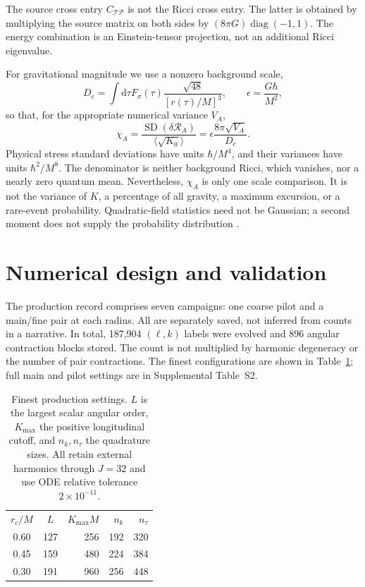\documentclass[aps,prd,reprint,floatfix,nofootinbib,longbibliography]{revtex4-2}
\newcommand{\dd}{\mathrm{d}}
\newcommand{\Tr}{\mathcal{T}}
\newcommand{\Pp}{\mathcal{P}}
\newcommand{\ee}{\epsilon}
\newcommand{\RMS}{\operatorname{SD}}
\begin{document}
The source cross entry $C_{\Tr\Pp}$ is not the Ricci cross entry. The latter is obtained by multiplying the source matrix on both sides by $(8\pi G)\operatorname{diag}(-1,1)$. The energy combination is an Einstein-tensor projection, not an additional Ricci eigenvalue.

For gravitational magnitude we use a nonzero background scale,
\begin{equation}
 D_c=\int\dd\tau F_\sigma(\tau)\frac{\sqrt{48}}{[r(\tau)/M]^3},
 \qquad \ee=\frac{G\hbar}{M^2},
\end{equation}
so that, for the appropriate numerical variance $V_A$,
\begin{equation}
 \chi_A=\frac{\RMS(\delta\mathcal R_A)}{\langle\sqrt{K_0}\rangle}
       =\ee\frac{8\pi\sqrt{V_A}}{D_c}.
 \label{eq:chi}
\end{equation}
Physical stress standard deviations have units $\hbar/M^4$, and their variances have units $\hbar^2/M^8$. The denominator is neither background Ricci, which vanishes, nor a nearly zero quantum mean. Nevertheless, $\chi_A$ is only one scale comparison. It is not the variance of $K$, a percentage of all gravity, a maximum excursion, or a rare-event probability. Quadratic-field statistics need not be Gaussian; a second moment does not supply the probability distribution \cite{FewsterFordRoman2012}.

\section{Numerical design and validation}
The production record comprises seven campaigns: one coarse pilot and a main/fine pair at each radius. All are separately saved, not inferred from counts in a narrative. In total, 187,904 $(\ell,k)$ labels were evolved and 896 angular contraction blocks stored. The count is not multiplied by harmonic degeneracy or the number of pair contractions. The finest configurations are shown in Table~\ref{tab:grids}; full main and pilot settings are in Supplemental Table~S2.

\begin{table}[tb]
\caption{Finest production settings. $L$ is the largest scalar angular order, $K_{\max}$ the positive longitudinal cutoff, and $n_k,n_\tau$ the quadrature sizes. All retain external harmonics through $J=32$ and use ODE relative tolerance $2\times10^{-11}$.}
\label{tab:grids}
\begin{ruledtabular}
\begin{tabular}{ccrrr}
$r_c/M$&$L$&$K_{\max}M$&$n_k$&$n_\tau$\\
0.60&127&256&192&320\\
0.45&159&480&224&384\\
0.30&191&960&256&448
\end{tabular}
\end{ruledtabular}
\end{table}
\end{document}
